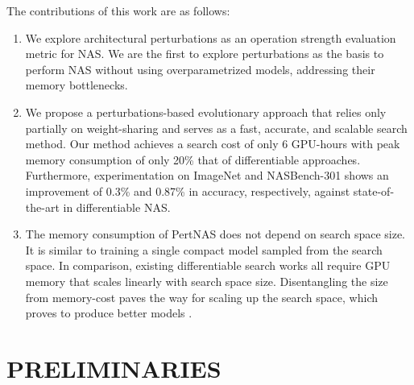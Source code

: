 \documentclass[onecolumn]{IEEEtran}
\begin{document}
The contributions of this work are as follows:
\begin{enumerate}
	\item We explore architectural perturbations as an operation strength evaluation metric for NAS. We are the first to explore perturbations as the basis to perform NAS without using overparametrized models, addressing their memory bottlenecks.
	\item We propose a perturbations-based evolutionary approach that relies only partially on weight-sharing and serves as a fast, accurate, and scalable search method. Our method achieves a search cost of only 6 GPU-hours with peak memory consumption of only 20\% that of differentiable approaches. Furthermore, experimentation on ImageNet and NASBench-301 shows an improvement of 0.3\% and 0.87\% in accuracy, respectively, against state-of-the-art in differentiable NAS.
	\item The memory consumption of PertNAS does not depend on search space size. It is similar to training a single compact model sampled from the search space. In comparison, existing differentiable search works \cite{Liu2018, Wang2021} all require GPU memory that scales linearly with search space size. Disentangling the size from memory-cost paves the way for scaling up the search space, which proves to produce better models \cite{Howard2019}.
\end{enumerate}

\section{PRELIMINARIES}
\end{document}
